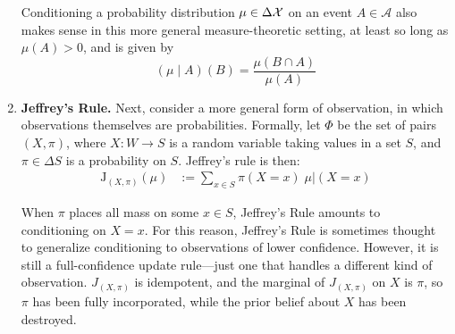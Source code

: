 \begin{enumerate}[wide, label=\textbf{\thesubsection.\arabic*}]
{	

	Conditioning a probability distribution $\mu \in \Delta\mathcal X$ on an event $A \in \mathcal A$ also makes sense in this more general measure-theoretic setting, at least so long as $\mu(A) > 0$, and is given by
	$$
		(\mu \mid A) (B) = \frac{\mu(B \cap A)}{\mu(A)}
	$$
	}


	\item
	\textbf{Jeffrey's Rule.}
	Next, consider a more general form of observation, in which observations themselves are probabilities.
	Formally, let $\Phi$ be the set of pairs $(X,\pi)$,
	where $X : W \to S$ is a random variable taking values in a set $S$,
	and $\pi \in \Delta S$ is a probability on
	$S$.
	Jeffrey's rule is then:
	\begin{align*}
		\mathrm{J}_{(X,\pi)}
		(\mu) &:= \sum_{x \in S} \pi(X{=}x) \;  \mu \big|
            (X{=}x)
	\end{align*}

	When $\pi$ places all mass on some $x \in S$, Jeffrey's Rule amounts to conditioning on $X {=} x$.
	For this reason, Jeffrey's Rule is sometimes thought to 
		generalize conditioning to observations of lower confidence.
	However, it is still a full-confidence update rule---just 
	one that handles a different kind of observation.
	$J_{(X,\pi)}$ is idempotent, and the marginal of $J_{(X,\pi)}$ on $X$ is $\pi$, so $\pi$ has been fully 
	incorporated, while the prior belief about $X$ has been destroyed.
\end{enumerate}


